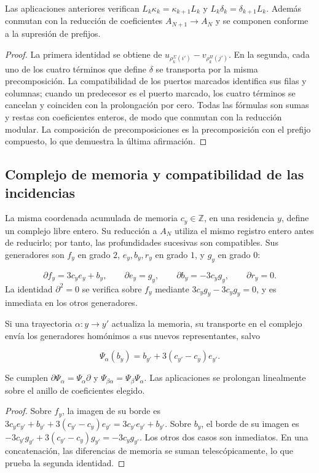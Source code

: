 \begin{proposition}
\label{iv:rectangular-natural}
Las aplicaciones anteriores verifican
\(L_k\kappa_k=\kappa_{k+1}L_k\) y
\(L_k\delta_k=\delta_{k+1}L_k\).
Además conmutan con la reducción de coeficientes
\(A_{N+1}\to A_N\) y se componen conforme a la supresión de prefijos.
\end{proposition}
\begin{proof}
La primera identidad se obtiene de
\(u_{\rho_k^\Sigma(i')}-v_{\rho_k^\Pi(j')}\).
En la segunda, cada uno de los cuatro términos que define \(\delta\)
se transporta por la misma precomposición. La compatibilidad de los
puertos marcados identifica sus filas y columnas; cuando un predecesor es
el puerto marcado, los cuatro términos se cancelan y coinciden con
la prolongación por cero. Todas las fórmulas son sumas y restas con
coeficientes enteros, de modo que conmutan con la reducción modular.
La composición de precomposiciones es la precomposición con el
prefijo compuesto, lo que demuestra la última afirmación.
\end{proof}

\subsection{Complejo de memoria y compatibilidad de las incidencias}
\label{iv:cont:memoria}
La misma coordenada acumulada de memoria \(c_y\in\mathbb Z\), en una residencia \(y\), define un complejo libre entero. Su reducción a \(A_N\) utiliza el mismo registro entero antes de reducirlo; por tanto, las profundidades sucesivas son compatibles. Sus generadores son \(f_y\) en grado \(2\), \(e_y,b_y,r_y\) en grado \(1\), y \(g_y\) en grado \(0\):

\[
\partial f_y=3c_y e_y+b_y,\qquad
\partial e_y=g_y,\qquad
\partial b_y=-3c_y g_y,\qquad
\partial r_y=0.
\]
La identidad \(\partial^2=0\) se verifica sobre \(f_y\) mediante \(3c_yg_y-3c_yg_y=0\), y es inmediata en los otros generadores.

Si una trayectoria \(\alpha:y\to y'\) actualiza la memoria, su transporte en el complejo envía los generadores homónimos a sus nuevos representantes, salvo

\[
\Psi_\alpha(b_y)=b_{y'}+3(c_{y'}-c_y)e_{y'}.
\]
\begin{proposition}
\label{iv:cont:memoria-natural}
Se cumplen \(\partial\Psi_\alpha=\Psi_\alpha\partial\) y \(\Psi_{\beta\alpha}=\Psi_\beta\Psi_\alpha\). Las aplicaciones se prolongan linealmente sobre el anillo de coeficientes elegido.

\end{proposition}
\begin{proof}
Sobre \(f_y\), la imagen de su borde es \(3c_ye_{y'}+b_{y'}+3(c_{y'}-c_y)e_{y'} =3c_{y'}e_{y'}+b_{y'}\). Sobre \(b_y\), el borde de su imagen es \(-3c_{y'}g_{y'}+3(c_{y'}-c_y)g_{y'}=-3c_yg_{y'}\). Los otros dos casos son inmediatos. En una concatenación, las diferencias de memoria se suman telescópicamente, lo que prueba la segunda identidad.
\end{proof}

